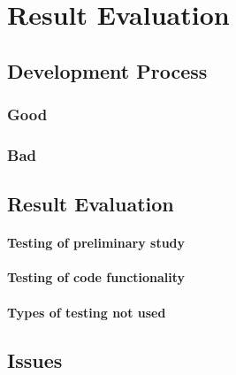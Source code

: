 
\chapter{Result Evaluation}
\minitoc

\clearpage



\section{Development Process}

\subsection*{Good}

\subsection*{Bad}


\section{Result Evaluation}

\subsubsection{Testing of preliminary study}

\subsubsection{Testing of code functionality}

\subsubsection{Types of testing not used}


\section{Issues}\label{sec:issues}

